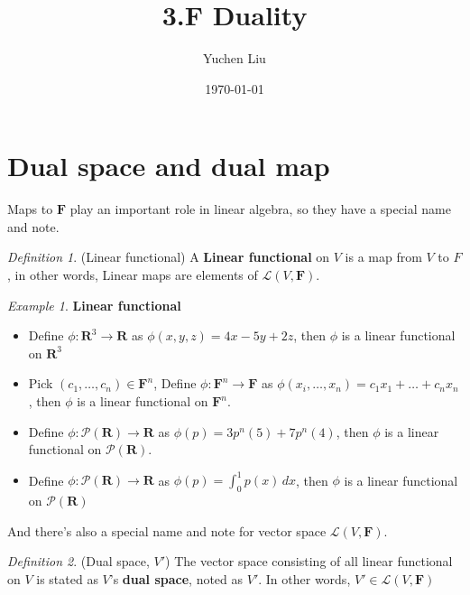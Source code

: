 \documentclass{article}
\title{3.F Duality}
\author{Yuchen Liu}
\date{\today}
\begin{document}
\maketitle

\theoremstyle{definition}
\theoremstyle{remark}
\newtheorem{definition}{Definition}
\newtheorem{example}{Example}

\section{Dual space and dual map}
\par Maps to $\textbf{F}$ play an important role in linear algebra, so they have a special name and note.
\begin{definition}
    (Linear functional) A \textbf{Linear functional} on $V$ is a map from $V$ to \textbf{$F$}, in other words, Linear maps are elements of $\mathcal{L}(V,\textbf{F})$.
\end{definition}
\begin{example}
    \textbf{Linear functional}
    \begin{itemize}
        \item Define $\phi: \textbf{R}^3 \rightarrow \textbf{R}$ as $\phi(x, y, z) = 4x - 5y + 2z$, then $\phi$ is a linear functional on $\textbf{R}^3$
        \item Pick $(c_1,\dots,c_n) \in \textbf{F}^n$, Define $\phi: \textbf{F}^n \rightarrow \textbf{F}$ as $\phi(x_i,\dots,x_n) = c_1 x_1 + \dots + c_n x_n$, then $\phi$ is a linear functional on $\textbf{F}^n$.
        \item Define $\phi: \mathcal{P}(\textbf{R}) \rightarrow \textbf{R}$ as $\phi(p) = 3p^n(5) + 7p^n(4)$, then $\phi$ is a linear functional on $\mathcal{P}(\textbf{R})$.
        \item Define $\phi: \mathcal{P}(\textbf{R}) \rightarrow \textbf{R}$ as $\phi(p) = \int_{0}^{1} p(x)\,dx $, then $\phi$ is a linear functional on $\mathcal{P}(\textbf{R})$
    \end{itemize}
\end{example}
\par And there's also a special name and note for vector space $\mathcal{L}(V, \textbf{F})$.
\begin{definition}
    (Dual space, $V'$) The vector space consisting of all linear functional on $V$ is stated as $V$'s \textbf{dual space}, noted as $V'$. In other words, $V' \in \mathcal{L}(V, \textbf{F})$
\end{definition}
\end{document}
